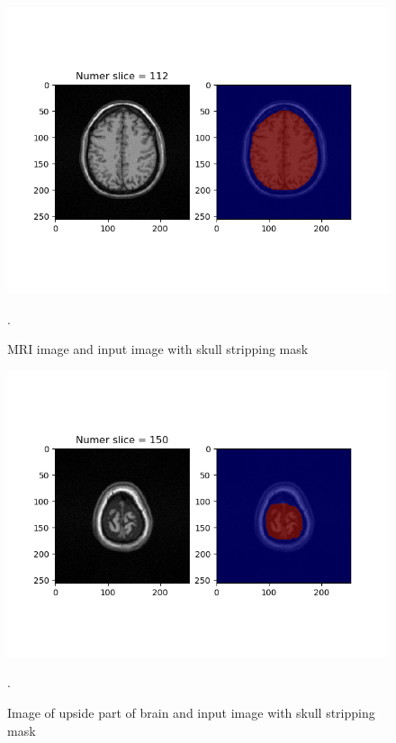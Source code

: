 \begin{figure}[H]
\centering{}\includegraphics[scale=0.8]{documentation/figures/M8_Figure_1-4.png}\caption{MRI image and input image with skull stripping mask}.
\label{fig:figures/Module8_Figure_3}
\end{figure}
\begin{figure}[H]
\centering{}\includegraphics[scale=0.8]{documentation/figures/M8_Figure_1-6.png}\caption{Image of upside part of brain and input image with skull stripping mask}.
\label{fig:figures/Module8_Figure_4}
\end{figure}